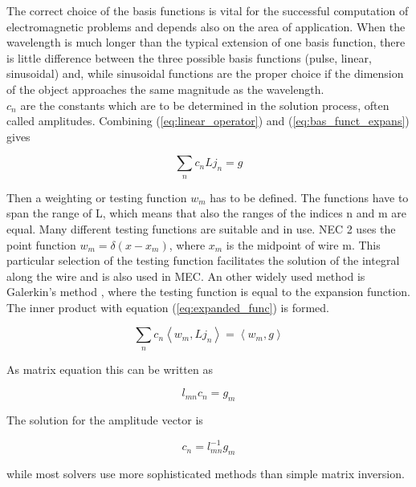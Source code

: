 \documentclass[a4paper,11pt]{thesis}
\begin{document}
The correct choice of the basis functions is vital for the successful computation of electromagnetic problems and depends also on the area of application. When the wavelength is much longer than the typical extension of one basis function, there is little difference between the three possible basis functions (pulse, linear, sinusoidal) and, while sinusoidal functions are the proper choice if the dimension of the object approaches the same magnitude as the wavelength.\\

$c_n$ are the constants which are to be determined in the solution process, often called amplitudes. Combining (\ref{eq:linear_operator}) and (\ref{eq:bas_funct_expans}) gives

\begin{equation}\label{eq:expanded_func}
 \sum_{n} c_n L j_n=g
\end{equation}

Then a weighting or testing function $w_m$ has to be defined. The functions have to span the range of L, which means that also the ranges of the indices n and m are equal. Many different testing functions are suitable and in use. NEC 2 uses the point function $w_m=\delta(x-x_m)$, where $x_m$ is the midpoint of wire m. This particular selection of the testing function facilitates the solution of the integral along the wire and is also used in MEC. An other widely used method is Galerkin's method \cite{harrington}, where the testing function is equal to the expansion function.\\


The inner product with equation (\ref{eq:expanded_func}) is formed.

\begin{equation}
 \sum_{n} c_n \left\langle w_m, L j_n\right\rangle = \left\langle w_m, g \right\rangle
\end{equation}

As matrix equation this can be written as

\begin{equation}
 l_{mn}c_n=g_m
\end{equation}

The solution for the amplitude vector is

\begin{equation}
 c_n=l_{mn}^{-1}g_m
\end{equation}

while most solvers use more sophisticated methods than simple matrix inversion.\\
\end{document}
